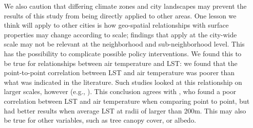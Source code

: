We also caution that differing climate zones and city landscapes may prevent the results of this study from being directly applied to other areas. One lesson we think will apply to other cities is how geo-spatial relationships with surface properties may change according to scale; findings that apply at the city-wide scale may not be relevant at the neighborhood and sub-neighborhood level. This has the possibility to complicate possible policy interventions. We found this to be true for relationships between air temperature and LST: we found that the point-to-point correlation between LST and air temperature was poorer than what was indicated in the literature. Such studies looked at this relationship on larger scales, however (e.g., \citet{Kloog2014132, Nichol2012153, Nichol2009276}). This conclusion agrees with \citet{white2013validating}, who found a poor correlation between LST and air temperature when comparing point to point, but had better results when average LST at radii of larger than 200m.
This may also be true for other variables, such as tree canopy cover, or albedo.  






